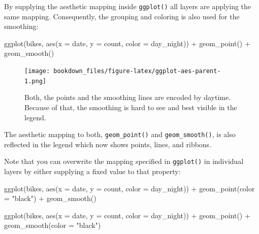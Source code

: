 \documentclass[
]{krantz}
\makeatletter
\newenvironment{Shaded}{\begin{snugshade}}{\end{snugshade}}
\newcommand{\AttributeTok}[1]{\textcolor[rgb]{0.61,0.61,0.61}{#1}}
\newcommand{\FunctionTok}[1]{\textcolor[rgb]{0,0,0}{#1}}
\newcommand{\NormalTok}[1]{#1}
\newcommand{\SpecialCharTok}[1]{\textcolor[rgb]{0,0,0}{#1}}
\newcommand{\StringTok}[1]{\textcolor[rgb]{0.5,0.5,0.5}{#1}}
\newenvironment{kframe}{%
\medskip{}
\setlength{\fboxsep}{.8em}
 \def\at@end@of@kframe{}%
 \ifinner\ifhmode%
  \def\at@end@of@kframe{\end{minipage}}%
  \begin{minipage}{\columnwidth}%
 \fi\fi%
 \def\FrameCommand##1{\hskip\@totalleftmargin \hskip-\fboxsep
 \colorbox{shadecolor}{##1}\hskip-\fboxsep
     \hskip-\linewidth \hskip-\@totalleftmargin \hskip\columnwidth}%
 \MakeFramed {\advance\hsize-\width
   \@totalleftmargin\z@ \linewidth\hsize
   \@setminipage}}%
 {\par\unskip\endMakeFramed%
 \at@end@of@kframe}
\renewenvironment{Shaded}{\begin{kframe}}{\end{kframe}}
\makeatother
\begin{document}
By supplying the aesthetic mapping inside \texttt{ggplot()} all layers are applying the same mapping. Consequently, the grouping and coloring is also used for the smoothing:

\begin{Shaded}
\begin{Highlighting}[]
\FunctionTok{ggplot}\NormalTok{(bikes, }\FunctionTok{aes}\NormalTok{(}\AttributeTok{x =}\NormalTok{ date, }\AttributeTok{y =}\NormalTok{ count, }\AttributeTok{color =}\NormalTok{ day\_night)) }\SpecialCharTok{+} 
  \FunctionTok{geom\_point}\NormalTok{() }\SpecialCharTok{+}
  \FunctionTok{geom\_smooth}\NormalTok{()}
\end{Highlighting}
\end{Shaded}

\begin{figure}
\centering
\texttt{[image: bookdown\_files/figure-latex/ggplot-aes-parent-1.png]}
\caption{\label{fig:ggplot-aes-parent}Both, the points and the smoothing lines are encoded by daytime. Because of that, the smoothing is hard to see and best visible in the legend.}
\end{figure}

The aesthetic mapping to both, \texttt{geom\_point()} and \texttt{geom\_smooth()}, is also reflected in the legend which now shows points, lines, and ribbons.

Note that you can overwrite the mapping specified in \texttt{ggplot()} in individual layers by either supplying a fixed value to that property:

\begin{Shaded}
\begin{Highlighting}[]
\FunctionTok{ggplot}\NormalTok{(bikes, }\FunctionTok{aes}\NormalTok{(}\AttributeTok{x =}\NormalTok{ date, }\AttributeTok{y =}\NormalTok{ count, }\AttributeTok{color =}\NormalTok{ day\_night)) }\SpecialCharTok{+} 
  \FunctionTok{geom\_point}\NormalTok{(}\AttributeTok{color =} \StringTok{"black"}\NormalTok{) }\SpecialCharTok{+}
  \FunctionTok{geom\_smooth}\NormalTok{()}

\FunctionTok{ggplot}\NormalTok{(bikes, }\FunctionTok{aes}\NormalTok{(}\AttributeTok{x =}\NormalTok{ date, }\AttributeTok{y =}\NormalTok{ count, }\AttributeTok{color =}\NormalTok{ day\_night)) }\SpecialCharTok{+} 
  \FunctionTok{geom\_point}\NormalTok{() }\SpecialCharTok{+}
  \FunctionTok{geom\_smooth}\NormalTok{(}\AttributeTok{color =} \StringTok{"black"}\NormalTok{)}
\end{Highlighting}
\end{Shaded}
\end{document}
